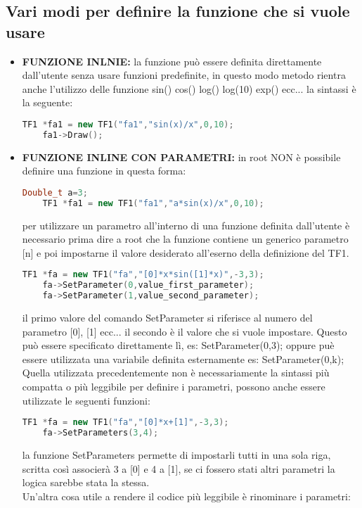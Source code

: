 \subsection{Vari modi per definire la funzione che si vuole usare}
\begin{itemize}
	\item \textbf{FUNZIONE INLNIE:} la funzione può essere definita direttamente dall'utente senza usare funzioni predefinite, in questo modo metodo rientra anche l'utilizzo delle funzione sin() cos() log() log(10) exp() ecc... la sintassi è la seguente:
\begin{lstlisting}[language=C++]
	TF1 *fa1 = new TF1("fa1","sin(x)/x",0,10);
	fa1->Draw();
\end{lstlisting}
	\item \textbf{FUNZIONE INLINE CON PARAMETRI:} in root NON è possibile definire una funzione in questa forma:
\begin{lstlisting}[language=C++]
	Double_t a=3;
	TF1 *fa1 = new TF1("fa1","a*sin(x)/x",0,10);
\end{lstlisting}
	per utilizzare un parametro all'interno di una funzione definita dall'utente è necessario prima dire a root che la funzione contiene un generico parametro [n] e poi impostarne il valore desiderato all'eserno della definizione del TF1.
\begin{lstlisting}[language=C++]
	TF1 *fa = new TF1("fa","[0]*x*sin([1]*x)",-3,3);
	fa->SetParameter(0,value_first_parameter);
	fa->SetParameter(1,value_second_parameter);
\end{lstlisting}
il primo valore del comando SetParameter si riferisce al numero del parametro [0], [1] ecc... il secondo è il valore che si vuole impostare. Questo può essere specificato direttamente lì, es: SetParameter(0,3); oppure puè essere utilizzata una variabile definita esternamente es: SetParameter(0,k);\\
Quella utilizzata precedentemente non è necessariamente la sintassi più compatta o più leggibile per definire i parametri, possono anche essere utilizzate le seguenti funzioni:
\begin{lstlisting}[language=C++]
	TF1 *fa = new TF1("fa","[0]*x+[1]",-3,3);
	fa->SetParameters(3,4);
\end{lstlisting}
la funzione SetParameters permette di impostarli tutti in una sola riga, scritta così associerà 3 a [0] e 4 a [1], se ci fossero stati altri parametri la logica sarebbe stata la stessa.\\
Un'altra cosa utile a rendere il codice più leggibile è rinominare i parametri:

\end{itemize}
